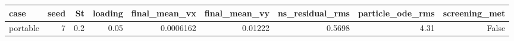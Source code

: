 \begin{tabular}{lrrrrrrrr}
\toprule
case & seed & St & loading & final\_mean\_vx & final\_mean\_vy & ns\_residual\_rms & particle\_ode\_rms & screening\_met \\
\midrule
portable & 7 & 0.2 & 0.05 & 0.0006162 & 0.01222 & 0.5698 & 4.31 & False \\
\bottomrule
\end{tabular}
